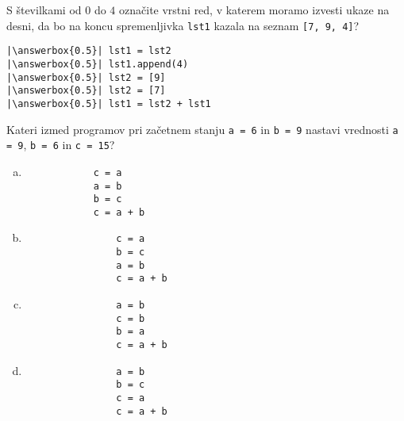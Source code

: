 \documentclass[arhiv, 10pt]{../izpit}
\newcommand{\inlinepy}[1]{\texttt{#1}}
\newcommand{\answerbox}[1]{\framebox{\vphantom{\large M}\hspace{#1cm}}}
\begin{document}
        \naloga*
        \begin{multicols}{2}
        \noindent 
        S številkami od $0$ do $4$ označite vrstni red, v katerem moramo izvesti ukaze na desni, da bo na koncu spremenljivka \inlinepy{lst1} kazala na seznam \inlinepy{[7, 9, 4]}?
    
        \columnbreak
        \noindent
        \begin{verbatim}
|\answerbox{0.5}| lst1 = lst2
|\answerbox{0.5}| lst1.append(4)
|\answerbox{0.5}| lst2 = [9]
|\answerbox{0.5}| lst2 = [7]
|\answerbox{0.5}| lst1 = lst2 + lst1

        \end{verbatim}
        \end{multicols}
    
            
        \naloga*
        
        Kateri izmed programov pri začetnem stanju
            \inlinepy{a = 6} in
            \inlinepy{b = 9}
        nastavi vrednosti
            \inlinepy{a = 9},
            \inlinepy{b = 6} in
            \inlinepy{c = 15}?
    
        \begin{multicols}{4}
        \begin{enumerate}[(a)]
\item 
            \begin{verbatim}
            c = a
            a = b
            b = c
            c = a + b
            \end{verbatim}
        
\item 
                \begin{verbatim}
                c = a
                b = c
                a = b
                c = a + b
                \end{verbatim}
            
\item 
                \begin{verbatim}
                a = b
                c = b
                b = a
                c = a + b
                \end{verbatim}
            
\item 
                \begin{verbatim}
                a = b
                b = c
                c = a
                c = a + b
                \end{verbatim}
            
\end{enumerate}

        \end{multicols}
    
\end{document}
